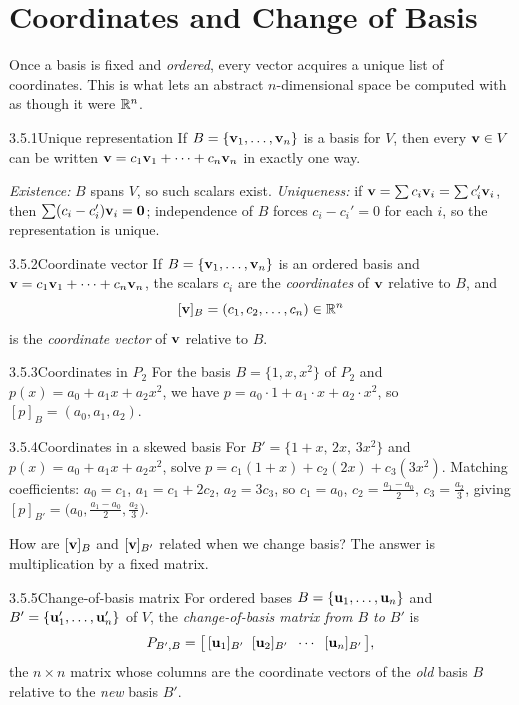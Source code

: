 \section{Coordinates and Change of Basis}
\label{sec:3.5}

Once a basis is fixed and \emph{ordered}, every vector acquires a unique list of coordinates. This is what lets an abstract $n$-dimensional space be computed with as though it were $\mathbb{R}^n$.

\begin{thms}{3.5.1}{Unique representation}
If $B=\{\mathbf{v}_1,\dots,\mathbf{v}_n\}$ is a basis for $V$, then every $\mathbf{v}\in V$ can be written $\mathbf{v}=c_1\mathbf{v}_1+\cdots+c_n\mathbf{v}_n$ in exactly one way.
\end{thms}

\begin{prf}
\emph{Existence:} $B$ spans $V$, so such scalars exist. \emph{Uniqueness:} if $\mathbf{v}=\sum c_i\mathbf{v}_i=\sum c_i'\mathbf{v}_i$, then $\sum(c_i-c_i')\mathbf{v}_i=\mathbf{0}$; independence of $B$ forces $c_i-c_i'=0$ for each $i$, so the representation is unique.
\end{prf}

\begin{defns}{3.5.2}{Coordinate vector}
If $B=\{\mathbf{v}_1,\dots,\mathbf{v}_n\}$ is an ordered basis and $\mathbf{v}=c_1\mathbf{v}_1+\cdots+c_n\mathbf{v}_n$, the scalars $c_i$ are the \emph{coordinates} of $\mathbf{v}$ relative to $B$, and
\[
[\mathbf{v}]_B=(c_1,c_2,\dots,c_n)\in\mathbb{R}^n
\]
is the \emph{coordinate vector} of $\mathbf{v}$ relative to $B$.
\end{defns}

\begin{exmp}{3.5.3}{Coordinates in $P_2$}
For the basis $B=\{1,x,x^2\}$ of $P_2$ and $p(x)=a_0+a_1x+a_2x^2$, we have $p=a_0\cdot1+a_1\cdot x+a_2\cdot x^2$, so $[p]_B=(a_0,a_1,a_2)$.
\end{exmp}

\begin{exmp}{3.5.4}{Coordinates in a skewed basis}
For $B'=\{1+x,\,2x,\,3x^2\}$ and $p(x)=a_0+a_1x+a_2x^2$, solve $p=c_1(1+x)+c_2(2x)+c_3(3x^2)$. Matching coefficients: $a_0=c_1$, $a_1=c_1+2c_2$, $a_2=3c_3$, so $c_1=a_0$, $c_2=\tfrac{a_1-a_0}{2}$, $c_3=\tfrac{a_2}{3}$, giving $[p]_{B'}=\bigl(a_0,\tfrac{a_1-a_0}{2},\tfrac{a_2}{3}\bigr)$.
\end{exmp}

How are $[\mathbf{v}]_B$ and $[\mathbf{v}]_{B'}$ related when we change basis? The answer is multiplication by a fixed matrix.

\begin{defns}{3.5.5}{Change-of-basis matrix}
For ordered bases $B=\{\mathbf{u}_1,\dots,\mathbf{u}_n\}$ and $B'=\{\mathbf{u}_1',\dots,\mathbf{u}_n'\}$ of $V$, the \emph{change-of-basis matrix from $B$ to $B'$} is
\[
P_{B',B}=\bigl[\,[\mathbf{u}_1]_{B'}\;\;[\mathbf{u}_2]_{B'}\;\;\cdots\;\;[\mathbf{u}_n]_{B'}\,\bigr],
\]
the $n\times n$ matrix whose columns are the coordinate vectors of the \emph{old} basis $B$ relative to the \emph{new} basis $B'$.
\end{defns}

